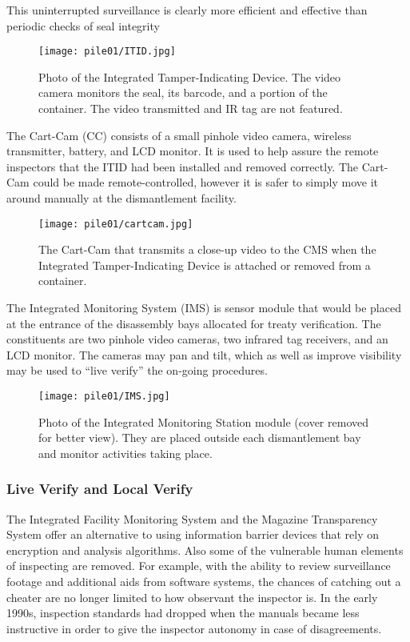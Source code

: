 \documentclass[twoside,titlepage,11pt,twocolumn,a4paper]{article}
\begin{document}
This uninterrupted surveillance is clearly more efficient and 
effective than periodic checks of seal integrity

\begin{figure}
  \texttt{[image: pile01/ITID.jpg]}
  \caption{Photo of the Integrated Tamper-Indicating Device. The video
    camera monitors the seal, its barcode, and a portion of the
    container. The video transmitted and IR tag are not
    featured. \citep{gerdes2001}}
\end{figure}

The Cart-Cam (CC) consists of a small pinhole video camera, 
wireless transmitter, battery, and LCD monitor. It is used to 
help assure the remote inspectors that the ITID had been 
installed and removed correctly. The Cart-Cam could be made 
remote-controlled, however it is safer to simply move it 
around manually at the dismantlement facility.

\begin{figure}
  \texttt{[image: pile01/cartcam.jpg]}
  \caption{The Cart-Cam that transmits a close-up video to the CMS
    when the Integrated Tamper-Indicating Device is attached or
    removed from a container. \citep{gerdes2001}}
\end{figure}

The Integrated Monitoring System (IMS) is sensor module that would 
be placed at the entrance of the disassembly bays allocated for 
treaty verification. The constituents are two pinhole video cameras, 
two infrared tag receivers, and an LCD monitor. The cameras may pan 
and tilt, which as well as improve visibility may be used to 
``live verify'' the on-going procedures. 

\begin{figure}
  \texttt{[image: pile01/IMS.jpg]}
  \caption{Photo of the Integrated Monitoring Station module (cover
    removed for better view). They are placed outside each
    dismantlement bay and monitor activities taking
    place. \citep{gerdes2001}}
\end{figure}

\subsubsection{Live Verify and Local Verify}
The Integrated Facility Monitoring System and the Magazine Transparency 
System offer an alternative to using information barrier devices 
that rely on encryption and analysis algorithms. Also some of the 
vulnerable human elements of inspecting are removed. For example, 
with the ability to review surveillance footage and additional aids 
from software systems, the chances of catching out a cheater are no 
longer limited to how observant the inspector is.  In the early 1990s, 
inspection standards had dropped when the manuals became less 
instructive in order to give the inspector autonomy in case of 
disagreements. \citep{welch2008}
\end{document}
